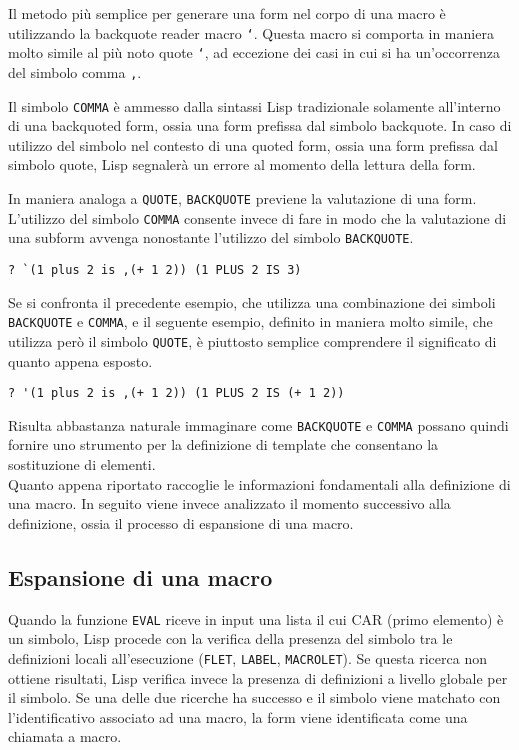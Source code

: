 Il metodo più semplice per generare una form nel corpo di una macro è
utilizzando la backquote reader macro \texttt{`}. Questa macro si comporta in
maniera molto simile al più noto quote \texttt{‘}, ad eccezione dei casi in cui
si ha un’occorrenza del simbolo comma \texttt{,}.

Il simbolo \texttt{COMMA} è ammesso dalla sintassi Lisp tradizionale solamente
all’interno di una backquoted form, ossia una form prefissa dal simbolo
backquote. In caso di utilizzo del simbolo nel contesto di una quoted form,
ossia una form prefissa dal simbolo quote, Lisp segnalerà un errore al momento
della lettura della form.

In maniera analoga a \texttt{QUOTE}, \texttt{BACKQUOTE} previene la valutazione
di una form. L’utilizzo del simbolo \texttt{COMMA} consente invece di fare in
modo che la valutazione di una subform avvenga nonostante l’utilizzo del
simbolo \texttt{BACKQUOTE}.

\begin{lstlisting}
? `(1 plus 2 is ,(+ 1 2)) (1 PLUS 2 IS 3)
\end{lstlisting}

Se si confronta il precedente esempio, che utilizza una combinazione dei
simboli \texttt{BACKQUOTE} e \texttt{COMMA}, e il seguente esempio, definito in
maniera molto simile, che utilizza però il simbolo \texttt{QUOTE}, è piuttosto
semplice comprendere il significato di quanto appena esposto.

\begin{lstlisting}
? '(1 plus 2 is ,(+ 1 2)) (1 PLUS 2 IS (+ 1 2))
\end{lstlisting}

Risulta abbastanza naturale immaginare come \texttt{BACKQUOTE} e \texttt{COMMA}
possano quindi fornire uno strumento per la definizione di template che
consentano la sostituzione di elementi.\\

Quanto appena riportato raccoglie le informazioni fondamentali alla definizione
di una macro. In seguito viene invece analizzato il momento successivo alla
definizione, ossia il processo di espansione di una macro.

\subsection{Espansione di una macro}

Quando la funzione \texttt{EVAL} riceve in input una lista il cui CAR (primo
elemento) è un simbolo, Lisp procede con la verifica della presenza del simbolo
tra le definizioni locali all’esecuzione (\texttt{FLET}, \texttt{LABEL},
\texttt{MACROLET}). Se questa ricerca non ottiene risultati, Lisp verifica
invece la presenza di definizioni a livello globale per il simbolo. Se una
delle due ricerche ha successo e il simbolo viene matchato con l’identificativo
associato ad una macro, la form viene identificata come una chiamata a macro.


